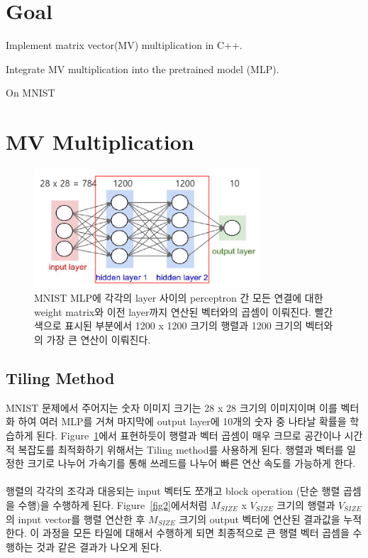\documentclass{article}
\begin{document}
\pagestyle{fancy}

\section*{Goal}

\begin{itemize*}
\item Implement matrix vector(MV) multiplication in C++.
\item Integrate MV multiplication into the pretrained model (MLP).
\begin{itemize*}
\item On MNIST
\end{itemize*}
\end{itemize*}

\section{MV Multiplication}

\begin{figure}[ht]
	\centering
	\includegraphics[width=0.75\textwidth]{fig1.png}
	\caption{MNIST MLP에 각각의 layer 사이의 perceptron 간 모든 연결에 대한 weight matrix와 이전 layer까지 연산된 벡터와의 곱셈이 이뤄진다. 빨간색으로 표시된 부분에서 1200 x 1200 크기의 행렬과 1200 크기의 벡터와의 가장 큰 연산이 이뤄진다. }
\label{fig1}
\end{figure}

\subsection*{Tiling Method}

MNIST 문제에서 주어지는 숫자 이미지 크기는 28 x 28 크기의 이미지이며 이를 벡터화 하여 여러 MLP를 거쳐 마지막에 output layer에 10개의 숫자 중 나타날 확률을 학습하게 된다. Figure~\ref{fig1}에서 표현하듯이 행렬과 벡터 곱셈이 매우 크므로 공간이나 시간적 복잡도를 최적화하기 위해서는 Tiling method를 사용하게 된다. 행렬과 벡터를 일정한 크기로 나누어 가속기를 통해 쓰레드를 나누어 빠른 연산 속도를 가능하게 한다.\\
\\
행렬의 각각의 조각과 대응되는 input 벡터도 쪼개고 block operation (단순 행렬 곱셈을 수행)을 수행하게 된다. Figure~\ref{fig2}에서처럼 $M_{SIZE}$ x $V_{SIZE}$ 크기의 행렬과 $V_{SIZE}$의 input vector를 행렬 연산한 후 $M_{SIZE}$ 크기의 output 벡터에 연산된 결과값을 누적한다. 이 과정을 모든 타일에 대해서 수행하게 되면 최종적으로 큰 행렬 벡터 곱셈을 수행하는 것과 같은 결과가 나오게 된다.
\end{document}
